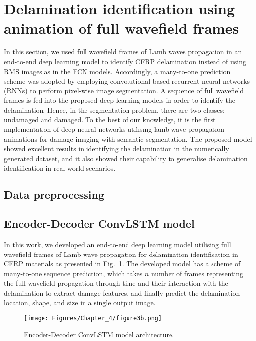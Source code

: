 \section{Delamination identification using animation of full wavefield frames}
\label{sec44}
In this section, we used full wavefield frames of Lamb waves propagation in an end-to-end deep learning model to identify CFRP delamination instead of using RMS images as in the FCN models.
Accordingly, a many-to-one prediction scheme was adopted by employing convolutional-based recurrent neural networks (RNNs) to perform pixel-wise image segmentation.
A sequence of full wavefield frames is fed into the proposed deep learning models in order to identify the delamination.
Hence, in the segmentation problem, there are two classes: undamaged and damaged.
To the best of our knowledge, it is the first implementation of deep neural networks utilising lamb wave propagation animations for damage imaging with semantic segmentation.
The proposed model showed excellent results in identifying the delamination in the numerically generated dataset, and it also showed their capability to generalise delamination identification in real world scenarios.
\subsection{Data preprocessing}
\subsection{Encoder-Decoder ConvLSTM model}
\label{proposed_approach}
In this work, we developed an end-to-end deep learning model utilising full wavefield frames of Lamb wave propagation for delamination identification in CFRP materials as presented in Fig.~\ref{fig:proposed_convLSTM_model}.
The developed model has a scheme of many-to-one sequence prediction, which takes \(n\) number of frames representing the full wavefield propagation through time and their interaction with the delamination to extract damage features, and finally predict the delamination location, shape, and size in a single output image.
\begin{figure} [!h]
	\centering
	\texttt{[image: Figures/Chapter\_4/figure3b.png]}
	\caption{Encoder-Decoder ConvLSTM model architecture.}
	\label{fig:proposed_convLSTM_model}
\end{figure} 

